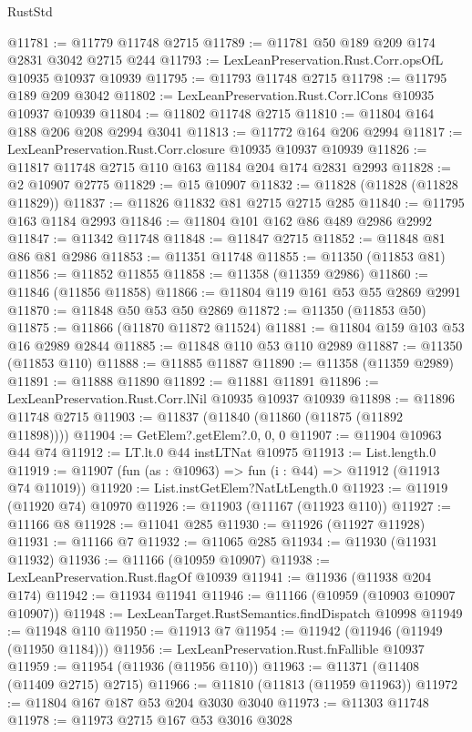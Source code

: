 \begin{lexlean}{RustStd}
\begin{coremodule}
@11781 := @11779 @11748 @2715
@11789 := @11781 @50 @189 @209 @174 @2831 @3042 @2715 @244
@11793 := LexLeanPreservation.Rust.Corr.opsOfL @10935 @10937 @10939
@11795 := @11793 @11748 @2715
@11798 := @11795 @189 @209 @3042
@11802 := LexLeanPreservation.Rust.Corr.lCons @10935 @10937 @10939
@11804 := @11802 @11748 @2715
@11810 := @11804 @164 @188 @206 @208 @2994 @3041
@11813 := @11772 @164 @206 @2994
@11817 := LexLeanPreservation.Rust.Corr.closure @10935 @10937 @10939
@11826 := @11817 @11748 @2715 @110 @163 @1184 @204 @174 @2831 @2993
@11828 := @2 @10907 @2775
@11829 := @15 @10907
@11832 := @11828 (@11828 (@11828 @11829))
@11837 := @11826 @11832 @81 @2715 @2715 @285
@11840 := @11795 @163 @1184 @2993
@11846 := @11804 @101 @162 @86 @489 @2986 @2992
@11847 := @11342 @11748
@11848 := @11847 @2715
@11852 := @11848 @81 @86 @81 @2986
@11853 := @11351 @11748
@11855 := @11350 (@11853 @81)
@11856 := @11852 @11855
@11858 := @11358 (@11359 @2986)
@11860 := @11846 (@11856 @11858)
@11866 := @11804 @119 @161 @53 @55 @2869 @2991
@11870 := @11848 @50 @53 @50 @2869
@11872 := @11350 (@11853 @50)
@11875 := @11866 (@11870 @11872 @11524)
@11881 := @11804 @159 @103 @53 @16 @2989 @2844
@11885 := @11848 @110 @53 @110 @2989
@11887 := @11350 (@11853 @110)
@11888 := @11885 @11887
@11890 := @11358 (@11359 @2989)
@11891 := @11888 @11890
@11892 := @11881 @11891
@11896 := LexLeanPreservation.Rust.Corr.lNil @10935 @10937 @10939
@11898 := @11896 @11748 @2715
@11903 := @11837 (@11840 (@11860 (@11875 (@11892 @11898))))
@11904 := GetElem?.getElem?.{0, 0, 0}
@11907 := @11904 @10963 @44 @74
@11912 := LT.lt.{0} @44 instLTNat @10975
@11913 := List.length.{0}
@11919 := @11907 (fun (as : @10963) => fun (i : @44) => @11912 (@11913 @74 @11019))
@11920 := List.instGetElem?NatLtLength.{0}
@11923 := @11919 (@11920 @74) @10970
@11926 := @11903 (@11167 (@11923 @110))
@11927 := @11166 @8
@11928 := @11041 @285
@11930 := @11926 (@11927 @11928)
@11931 := @11166 @7
@11932 := @11065 @285
@11934 := @11930 (@11931 @11932)
@11936 := @11166 (@10959 @10907)
@11938 := LexLeanPreservation.Rust.flagOf @10939
@11941 := @11936 (@11938 @204 @174)
@11942 := @11934 @11941
@11946 := @11166 (@10959 (@10903 @10907 @10907))
@11948 := LexLeanTarget.RustSemantics.findDispatch @10998
@11949 := @11948 @110
@11950 := @11913 @7
@11954 := @11942 (@11946 (@11949 (@11950 @1184)))
@11956 := LexLeanPreservation.Rust.fnFallible @10937
@11959 := @11954 (@11936 (@11956 @110))
@11963 := @11371 (@11408 (@11409 @2715) @2715)
@11966 := @11810 (@11813 (@11959 @11963))
@11972 := @11804 @167 @187 @53 @204 @3030 @3040
@11973 := @11303 @11748
@11978 := @11973 @2715 @167 @53 @3016 @3028

\end{coremodule}
\end{lexlean}
